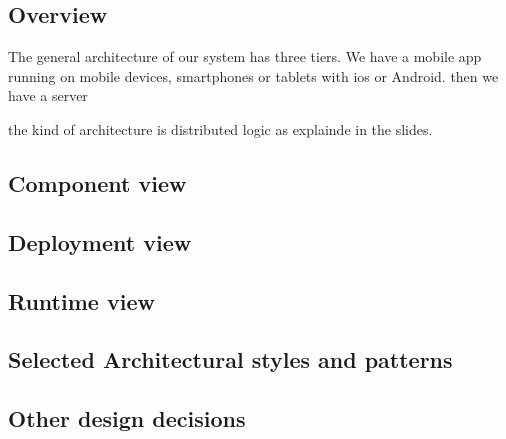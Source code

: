\subsection{Overview}

The general architecture of our system has three tiers.
We have a mobile app running on mobile devices, smartphones or tablets with ios or Android.
then we have a server

the kind of architecture is distributed logic as explainde in the slides.


\subsection{Component view}

\subsection{Deployment view}


\subsection{Runtime view}

\subsection{Selected Architectural styles and patterns}

\subsection{Other design decisions}
